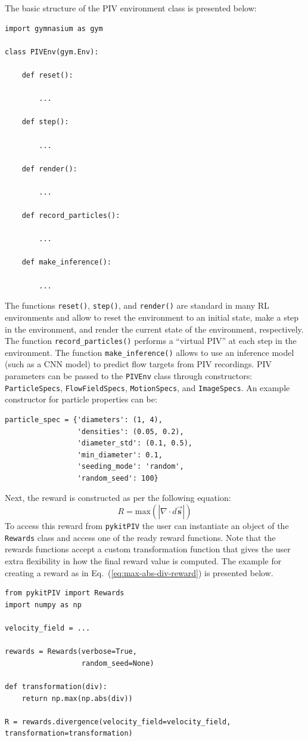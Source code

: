 \documentclass[a4paper,fleqn]{cas-dc}
\begin{document}
The basic structure of the PIV environment class is presented below:
\lstset{language=Python}
\begin{lstlisting}
import gymnasium as gym

class PIVEnv(gym.Env):

	def reset():
	
		...
		
	def step():
	
		...
	
	def render():
	
		...
	
	def record_particles():
	
		...
	
	def make_inference():

		...

\end{lstlisting}
The functions \texttt{reset()}, \texttt{step()}, and \texttt{render()} are standard in many RL environments and allow to reset the environment to an initial state, make a step in the environment, and render the current state of the environment, respectively.
The function \texttt{record\_particles()} performs a ``virtual PIV'' at each step in the environment. The function \texttt{make\_inference()} allows to use an inference model (such as a CNN model) to predict flow targets from PIV recordings. PIV parameters can be passed to the \texttt{PIVEnv} class through constructors: \texttt{ParticleSpecs}, \texttt{FlowFieldSpecs}, \texttt{MotionSpecs}, and \texttt{ImageSpecs}. An example constructor for particle properties can be:
\lstset{language=Python}
\begin{lstlisting}
particle_spec = {'diameters': (1, 4),
                 'densities': (0.05, 0.2),
                 'diameter_std': (0.1, 0.5),
                 'min_diameter': 0.1,
                 'seeding_mode': 'random',
                 'random_seed': 100}
\end{lstlisting}
 Next, the reward is constructed as per the following equation:
\begin{equation} \label{eq:max-abs-div-reward}
R = \text{max} ( |\nabla \cdot d\vec{\mathbf{s}} | ) 
\end{equation}
To access this reward from \texttt{pykitPIV} the user can instantiate an object of the \texttt{Rewards} class and access one of the ready reward functions. Note that the rewards functions accept a custom transformation function that gives the user extra flexibility in how the final reward value is computed. The example for creating a reward as in Eq.~(\ref{eq:max-abs-div-reward}) is presented below.
\lstset{language=Python}
\begin{lstlisting}
from pykitPIV import Rewards
import numpy as np

velocity_field = ...

rewards = Rewards(verbose=True,
                  random_seed=None)
                  
def transformation(div):
    return np.max(np.abs(div))
    
R = rewards.divergence(velocity_field=velocity_field,
transformation=transformation)
\end{lstlisting}
\end{document}
